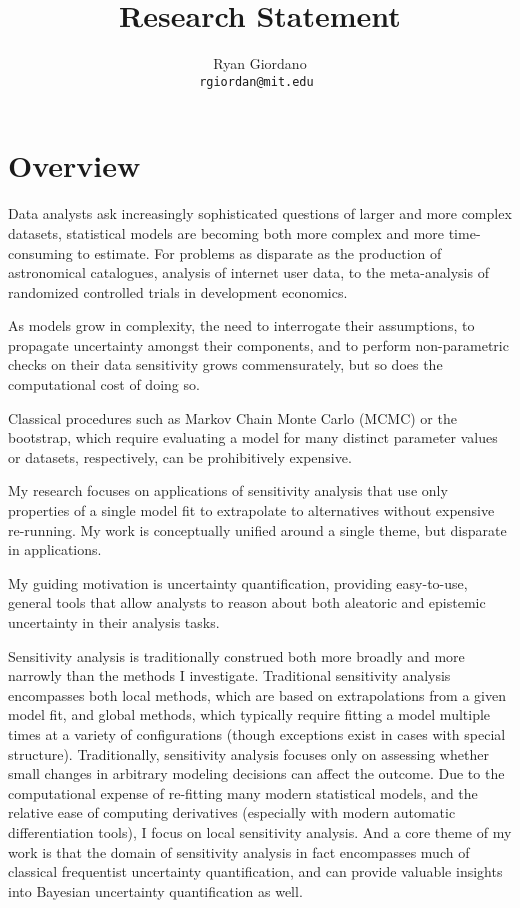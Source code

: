 

\title{Research Statement}

\author{
  Ryan Giordano \\ \texttt{rgiordan@mit.edu }
}




\section{Overview}

Data analysts ask increasingly sophisticated questions of larger and more
complex datasets, statistical models are becoming both more complex and more
time-consuming to estimate.   For problems as disparate as the production of
astronomical catalogues, analysis of internet user data, to the meta-analysis of
randomized controlled trials in development economics.

As models grow in complexity, the need to interrogate their assumptions,
to propagate uncertainty amongst their components, and to perform non-parametric
checks on their data sensitivity grows commensurately, but so does the
computational cost of doing so.

Classical procedures such as Markov Chain Monte Carlo (MCMC) or the bootstrap,
which require evaluating a model for many distinct parameter values or datasets,
respectively, can be prohibitively expensive.

My research focuses on applications of sensitivity analysis that use only
properties of a single model fit to extrapolate to alternatives without
expensive re-running.  My work is conceptually unified around a single theme,
but disparate in applications.

My guiding motivation is uncertainty quantification, providing easy-to-use,
general tools that allow analysts to reason about both aleatoric and epistemic
uncertainty in their analysis tasks.

Sensitivity analysis is traditionally construed both more broadly and more
narrowly than the methods I investigate.  Traditional sensitivity analysis
encompasses both local methods, which are based on extrapolations from
a given model fit, and global methods, which typically require fitting a model
multiple times at a variety of configurations (though exceptions exist
in cases with special structure).  Traditionally, sensitivity analysis focuses
only on assessing whether small changes in arbitrary modeling decisions
can affect the outcome.  Due to the computational expense of re-fitting
many modern statistical models, and the relative ease of computing
derivatives (especially with modern automatic differentiation tools),
I focus on local sensitivity analysis.  And a core theme of my work is that
the domain of sensitivity analysis in fact encompasses much of classical
frequentist uncertainty quantification, and can provide valuable insights
into Bayesian uncertainty quantification as well.


